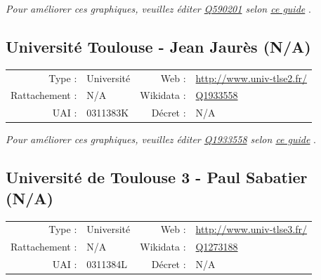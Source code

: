 \documentclass[12pt,french,landscape]{article}
\begin{document}
\textit{\scriptsize Pour améliorer ces graphiques, veuillez éditer \href{https://www.wikidata.org/entity/Q590201}{Q590201}  selon \href{https://github.com/cpesr/wikidataESR/blob/master/Rmd/wikidataESR.md}{ce guide}}
.


\newpage

\hypertarget{universituxe9-toulouse---jean-jauruxe8s-na}{%
\subsection{Université Toulouse - Jean Jaurès
(N/A)}\label{universituxe9-toulouse---jean-jauruxe8s-na}}

\begin{tabular*}{0.45\textwidth}{rp{2cm}rl}  
\hline  
Type : & Université & Web : &\href{http://www.univ-tlse2.fr/}{http://www.univ-tlse2.fr/} \\  
Rattachement : & N/A & Wikidata : & \href{https://www.wikidata.org/entity/Q1933558}{Q1933558} \\  
UAI : & 0311383K & Décret : & N/A \\  
\hline  
\end{tabular*}

\textit{\scriptsize Pour améliorer ces graphiques, veuillez éditer \href{https://www.wikidata.org/entity/Q1933558}{Q1933558}  selon \href{https://github.com/cpesr/wikidataESR/blob/master/Rmd/wikidataESR.md}{ce guide}}
.


\newpage

\hypertarget{universituxe9-de-toulouse-3---paul-sabatier-na}{%
\subsection{Université de Toulouse 3 - Paul Sabatier
(N/A)}\label{universituxe9-de-toulouse-3---paul-sabatier-na}}

\begin{tabular*}{0.45\textwidth}{rp{2cm}rl}  
\hline  
Type : & Université & Web : &\href{http://www.univ-tlse3.fr/}{http://www.univ-tlse3.fr/} \\  
Rattachement : & N/A & Wikidata : & \href{https://www.wikidata.org/entity/Q1273188}{Q1273188} \\  
UAI : & 0311384L & Décret : & N/A \\  
\hline  
\end{tabular*}
\end{document}
